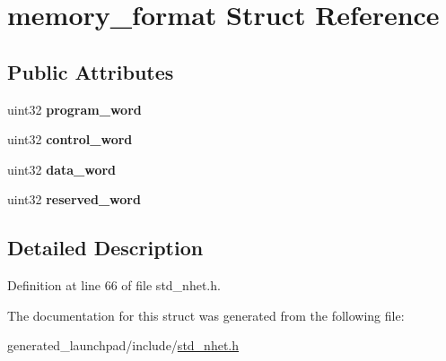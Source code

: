 \hypertarget{structmemory__format}{}\section{memory\+\_\+format Struct Reference}
\label{structmemory__format}
\subsection*{Public Attributes}
\begin{DoxyCompactItemize}
\item 
\mbox{\label{structmemory__format_a9ba015384acf9c98cbd704a8d405b621}} 
uint32 {\bfseries program\+\_\+word}
\item 
\mbox{\label{structmemory__format_a26a95ac2fa8b19caf2a28bf6a7b244d1}} 
uint32 {\bfseries control\+\_\+word}
\item 
\mbox{\label{structmemory__format_a51b712d66169133adaa492c9feb3e7c5}} 
uint32 {\bfseries data\+\_\+word}
\item 
\mbox{\label{structmemory__format_ae82a37dd7f0bbeb897d7d172021ee10f}} 
uint32 {\bfseries reserved\+\_\+word}
\end{DoxyCompactItemize}


\subsection{Detailed Description}


Definition at line 66 of file std\+\_\+nhet.\+h.



The documentation for this struct was generated from the following file\+:\begin{DoxyCompactItemize}
\item 
generated\+\_\+launchpad/include/\mbox{\hyperlink{std__nhet_8h}{std\+\_\+nhet.\+h}}\end{DoxyCompactItemize}
